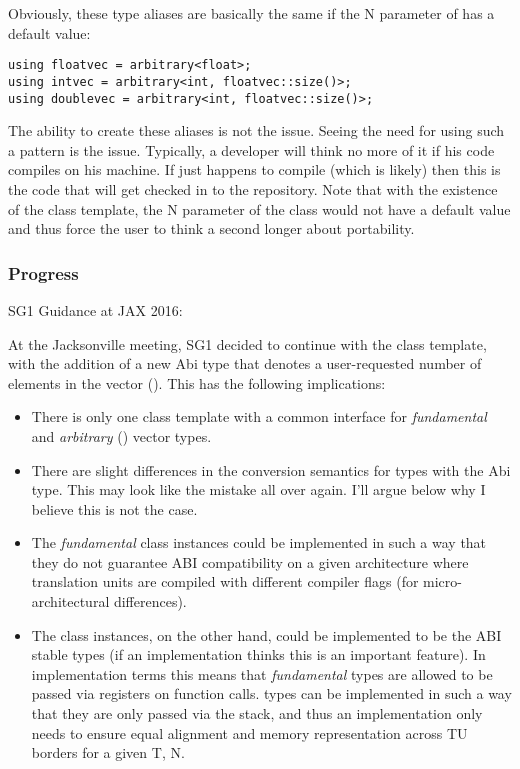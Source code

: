 Obviously, these type aliases are basically the same if the \code N parameter of  has a default value:
\smallskip\begin{lstlisting}[style=Vc]
using floatvec = arbitrary<float>;
using intvec = arbitrary<int, floatvec::size()>;
using doublevec = arbitrary<int, floatvec::size()>;
\end{lstlisting}
The ability to create these aliases is not the issue.
Seeing the need for using such a pattern is the issue.
Typically, a developer will think no more of it if his code compiles on his machine.
If  just happens to compile (which is likely) then this is the code that will get checked in to the repository.
Note that with the existence of the  class template, the \code N parameter of the  class would not have a default value and thus force the user to think a second longer about portability.

\subsubsection{Progress}\label{sec:fixedsize progress}
SG1 Guidance at JAX 2016:\\

At the Jacksonville meeting, SG1 decided to continue with the \datapar[<T, Abi>] class template, with the addition of a new Abi type that denotes a user-requested number of elements in the vector (\fixedsizeN).
This has the following implications:
\begin{itemize}
  \item There is only one class template with a common interface for \textit{fundamental} and \textit{arbitrary} (\fixedsize) vector types.
  \item There are slight differences in the conversion semantics for \datapar types with the \fixedsize Abi type.
    This may look like the  mistake all over again.
    I'll argue below why I believe this is not the case.
  \item The \textit{fundamental} class instances could be implemented in such a way that they do not guarantee ABI compatibility on a given architecture where translation units are compiled with different compiler flags (for micro-architectural differences).
  \item The \fixedsize class instances, on the other hand, could be implemented to be the ABI stable types (if an implementation thinks this is an important feature).
    In implementation terms this means that \textit{fundamental} types are allowed to be passed via registers on function calls.
    \fixedsize types can be implemented in such a way that they are only passed via the stack, and thus an implementation only needs to ensure equal alignment and memory representation across TU borders for a given \type T, \code N.
\end{itemize}

